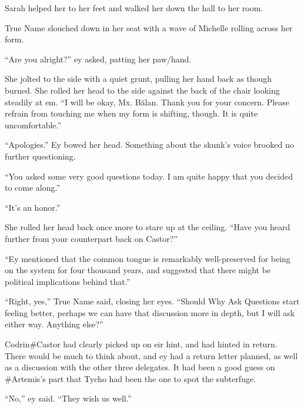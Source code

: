 Sarah helped her to her feet and walked her down the hall to her room.

True Name slouched down in her seat with a wave of Michelle rolling across her form.

``Are you alright?'' ey asked, patting her paw/hand.

She jolted to the side with a quiet grunt, pulling her hand back as though burned. She rolled her head to the side against the back of the chair looking steadily at em. ``I will be okay, Mx. Bălan. Thank you for your concern. Please refrain from touching me when my form is shifting, though. It is quite uncomfortable.''

``Apologies.'' Ey bowed her head. Something about the skunk's voice brooked no further questioning.

``You asked some very good questions today. I am quite happy that you decided to come along.''

``It's an honor.''

She rolled her head back once more to stare up at the ceiling. ``Have you heard further from your counterpart back on Castor?''

``Ey mentioned that the common tongue is remarkably well-preserved for being on the system for four thousand years, and suggested that there might be political implications behind that.''

``Right, yes,'' True Name said, closing her eyes. ``Should Why Ask Questions start feeling better, perhaps we can have that discussion more in depth, but I will ask either way. Anything else?''

Codrin\#Castor had clearly picked up on eir hint, and had hinted in return. There would be much to think about, and ey had a return letter planned, as well as a discussion with the other three delegates. It had been a good guess on \#Artemis's part that Tycho had been the one to spot the subterfuge.

``No,'' ey said. ``They wish us well.''
